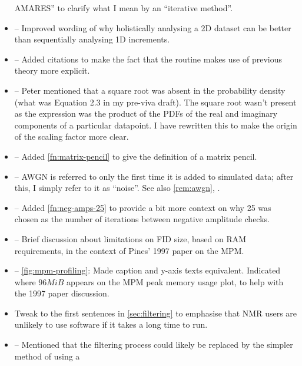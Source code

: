 \documentclass[12pt]{article}
\begin{document}
\begin{itemize}
            AMARES'' to clarify what I mean by an ``iterative method''.
        \item {} -- Improved wording of why holistically
            analysing a 2D dataset can be better than sequentially analysing 1D
            increments.
        \item {} -- Added citations to make the fact
            that the routine makes use of previous theory more explicit.
        \item {} -- Peter mentioned that a square
            root was absent in the probability density (what was Equation 2.3
            in my pre-viva draft). The square root wasn't present as the
            expression was the product of the PDFs of the real and imaginary
            components of a particular datapoint. I have rewritten this to make
            the origin of the scaling factor more clear.
        \item {} -- Added \cref{fn:matrix-pencil} to
            give the definition of a matrix pencil.
        \item {} -- AWGN is referred to only the first time it
            is added to simulated data; after this, I simply refer to it as ``noise''.
            See also \cref{rem:awgn}, .
        \item {} -- Added \cref{fn:neg-amps-25} to
            provide a bit more context on why 25 was chosen as the number of
            iterations between negative amplitude checks.
        \item {} -- Brief discussion about limitations
            on FID size, based on RAM requirements, in the context of Pines'
            1997 paper on the MPM.
        \item {} -- \cref{fig:mpm-profiling}: Made
            caption and y-axis texts equivalent. Indicated where $96MiB$
            appears on the MPM peak memory usage plot, to help with the 1997
            paper discussion.
        \item {} Tweak to the first sentences in
            \cref{sec:filtering} to emphasise that NMR users are unlikely to
            use software if it takes a long time to run.
        \item {} -- Mentioned that the filtering
            process could likely be replaced by the simpler method of using a

\end{itemize}
\end{document}
